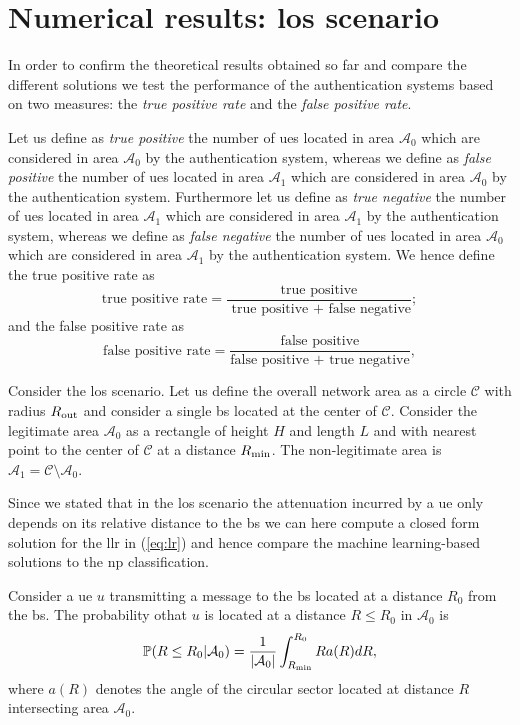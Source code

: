 \documentclass[draftcls,onecolumn,12pt]{IEEEtran}
\begin{document}
\section{Numerical results: los scenario}\label{sec:res_los}
In order to confirm the theoretical results obtained so far and compare the different solutions we test the performance of the authentication systems based on two measures: the \textit{true positive rate} and the \textit{false positive rate}. 

Let us define as \textit{true positive} the number of \acp{ue} located in area $\mathcal{A}_0$ which are considered in area $\mathcal{A}_0$ by the authentication system, whereas we define as \textit{false positive} the number of \acp{ue} located in area $\mathcal{A}_1$ which are considered in area $\mathcal{A}_0$ by the authentication system. Furthermore let us define as \textit{true negative} the number of \acp{ue} located in area $\mathcal{A}_1$ which are considered in area $\mathcal{A}_1$ by the authentication system, whereas we define as \textit{false negative} the number of \acp{ue} located in area $\mathcal{A}_0$ which are considered in area $\mathcal{A}_1$ by the authentication system.
We hence define the true positive rate as
\begin{equation}
    \text{true positive rate} = \frac{\text{true positive}}{\text{ true positive + false negative}};
\end{equation}
and the false positive rate as
\begin{equation}
    \text{false positive rate} = \frac{\text{false positive}}{\text{false positive + true negative}},
\end{equation}

Consider the \ac{los} scenario. Let us define the overall network area as a circle $\mathcal{C}$ with radius $R_{\rm out}$ and consider a single \ac{bs} located at the center of $\mathcal{C}$. Consider the legitimate area $\mathcal{A}_{0}$ as a rectangle of height $H$ and length $L$ and with nearest point to the center of $\mathcal{C}$ at a distance $R_{\rm min}$. The non-legitimate area is $\mathcal{A}_1 = \mathcal{C} \setminus \mathcal{A}_0$.

Since we stated that in the \ac{los} scenario the attenuation incurred by a \ac{ue} only depends on its relative distance to the \ac{bs} we can here compute a closed form solution for the \ac{llr} in (\ref{eq:lr}) and hence compare the machine learning-based solutions to the \ac{np} classification.

Consider a \ac{ue} $u$ transmitting a message to the \ac{bs} located at a distance $R_0$ from the \ac{bs}. The probability othat $u$ is located at a distance $R\le R_0$ in $\mathcal{A}_0$ is
\begin{equation}\label{eq:cdf}
     \mathbb{P}(R \le R_0|\mathcal{A}_0) = \frac{1}{|\mathcal{A}_0|}\int_{R_{\rm min}}^{R_0} R a(R) dR,
\end{equation}
where $a(R)$ denotes the angle of the circular sector located at distance $R$ intersecting area $\mathcal{A}_0$.
\end{document}
